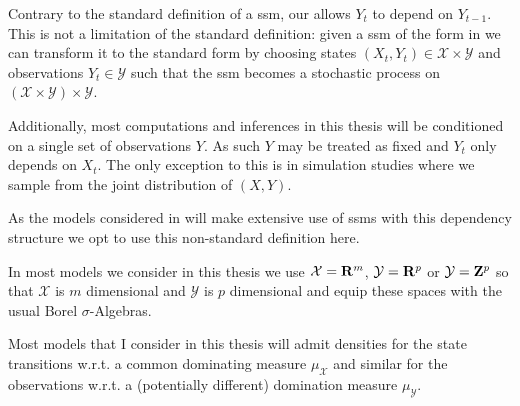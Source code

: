 \begin{remark}
    Contrary to the standard definition of a \gls{ssm}, our  allows $Y_t$ to depend on $Y_{t - 1}$.
    This is not a limitation of the standard definition: given a \gls{ssm} of the form in  we can transform it to the standard form by choosing states $(X_t, Y_t) \in \mathcal X \times \mathcal Y$ and observations $Y_t \in \mathcal Y$ such that the \gls{ssm} becomes a stochastic process on $ \left( \mathcal X \times \mathcal Y\right) \times \mathcal Y$.

    Additionally, most computations and inferences in this thesis will be conditioned on a single set of observations $Y$. As such $Y$ may be treated as fixed and $Y_{t}$ only depends on $X_{t}$. The only exception to this is in simulation studies where we sample from the joint distribution of $(X, Y)$.

    As the models considered in  will make extensive use of \glspl{ssm} with this dependency structure we opt to use this non-standard definition here.

    In most models we consider in this thesis we use $\mathcal X = \mathbf R^m$, $\mathcal Y = \mathbf R^p$ or $\mathcal Y = \mathbf Z^p$ so that $\mathcal X$ is $m$ dimensional and $\mathcal Y$ is $p$ dimensional and equip these spaces with the usual Borel $\sigma$-Algebras.
\end{remark}

Most models that I consider in this thesis will admit densities for the state transitions w.r.t. a common dominating measure $\mu_{\mathcal X}$ and similar for the observations w.r.t. a (potentially different) domination measure $\mu_{\mathcal Y}$. 

